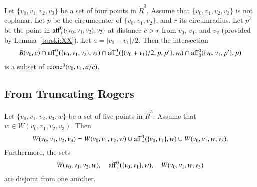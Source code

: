 \begin{tarskidata}
\begin{tarski}

\begin{lemma}
Let $\{v_0,v_1,v_2,v_3\}$ be a set of four points in $\ring{R}^3$.
Assume that $\{v_0,v_1,v_2,v_3\}$ is not coplanar.  Let $p$
be the circumcenter of $\{v_0,v_1,v_2\}$, and $r$ its circumradius.  
Let $p'$ be the
point in ${\operatorname{aff}}_+^0(\{v_0,v_1,v_2\},v_3\}$ at distance
$c > r$ from $v_0$, $v_1$, and $v_2$ (provided by Lemma~\ref{tarski:XX}).
Let $a = |v_0-v_1|/2$.
Then the intersection
  $$
  B(v_0,c)\cap
  {\operatorname{aff}}^0_+(\{v_0,v_1,v_2\},v_3) \cap
  {\operatorname{aff}}^0_-(\{(v_0+v_1)/2,p,p' \},v_0) \cap
  {\operatorname{aff}}^0_0(\{v_0,v_1,p'\},p)
  $$
is a subset of ${\operatorname{rcone}}^0(v_0,v_1,a/c)$.
\end{lemma}

\begin{proved}
\swallowed\end{proved}
\end{tarski}







\begin{tarski}
\section{From Truncating Rogers}

\begin{lemma}
Let $\{v_0,v_1,v_2,v_3,w\}$ be a set of five points in $\ring{R}^3$.
Assume that $w\in W(v_0,v_1,v_2,v_3)$. Then
$$
W(v_0,v_1,v_2,v_3) = W(v_0,v_1,v_2,w) \cup {\operatorname{aff}}_+^0(\{v_0,v_1\},w)
\cup W(v_0,v_1,w,v_3).
$$
Furthermore, the sets
$$
W(v_0,v_1,v_2,w),\quad {\operatorname{aff}}_+^0(\{v_0,v_1\},w),\quad
W(v_0,v_1,w,v_3)
$$
are disjoint from one another.
\end{lemma}

\begin{proved}
\swallowed\end{proved}
\end{tarski}






\end{tarskidata}
